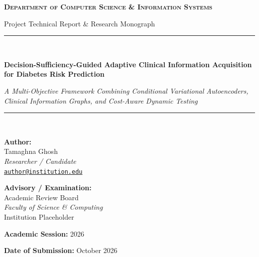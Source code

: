 \documentclass[11pt,a4paper]{report}
\begin{document}
\begin{titlepage}
  \centering
  \vspace*{1.5cm}
  
  {\Large\bfseries\scshape Department of Computer Science \& Information Systems\par}
  {\large Project Technical Report \& Research Monograph\par}
  
  \vspace{1.5cm}
  \rule{\linewidth}{1.5pt}\\[0.4cm]
  {\huge\bfseries\color{dssblue} Decision-Sufficiency-Guided Adaptive Clinical Information Acquisition for Diabetes Risk Prediction\par}
  \vspace{0.2cm}
  {\Large\itshape A Multi-Objective Framework Combining Conditional Variational Autoencoders, Clinical Information Graphs, and Cost-Aware Dynamic Testing\par}
  \rule{\linewidth}{1.5pt}\\[1.5cm]
  
  \begin{minipage}[t]{0.48\textwidth}
    \begin{flushleft}
      \large
      \textbf{Author:}\\
      Tamaghna Ghosh\\
      \textit{Researcher / Candidate}\\
      \href{mailto:author@institution.edu}{\nolinkurl{author@institution.edu}}
    \end{flushleft}
  \end{minipage}
  \hfill
  \begin{minipage}[t]{0.48\textwidth}
    \begin{flushright}
      \large
      \textbf{Advisory / Examination:}\\
      Academic Review Board\\
      \textit{Faculty of Science \& Computing}\\
      Institution Placeholder
    \end{flushright}
  \end{minipage}
  
  \vfill
  {\large \textbf{Academic Session:} 2026\par}
  {\large \textbf{Date of Submission:} October 2026\par}
  \vspace{1cm}
\end{titlepage}
\end{document}
